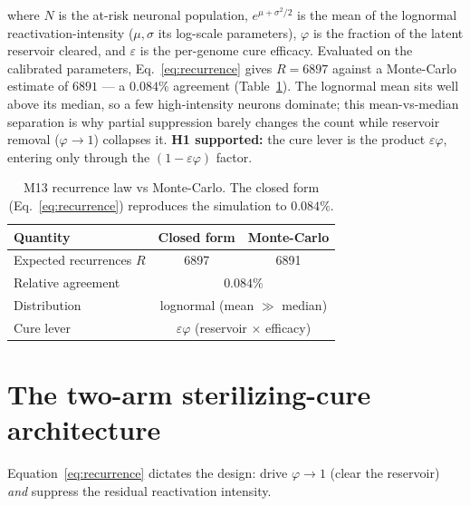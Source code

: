 \documentclass[11pt,a4paper]{article}
\begin{document}
where $N$ is the at-risk neuronal population, $e^{\mu+\sigma^2/2}$ is the mean of
the lognormal reactivation-intensity ($\mu,\sigma$ its log-scale parameters),
$\varphi$ is the fraction of the latent reservoir cleared, and $\varepsilon$ is
the per-genome cure efficacy. Evaluated on the calibrated parameters,
Eq.~\eqref{eq:recurrence} gives $R = 6897$ against a Monte-Carlo estimate of
$6891$ --- a $0.084\%$ agreement (Table~\ref{tab:m13}). The lognormal mean
sits well above its median, so a few high-intensity neurons dominate; this
mean-vs-median separation is why partial suppression barely changes the count
while reservoir removal ($\varphi\to 1$) collapses it. \textbf{H1 supported:}
the cure lever is the product $\varepsilon\varphi$, entering only through the
$(1-\varepsilon\varphi)$ factor.

\begin{table}[t]
\centering
\caption{M13 recurrence law vs Monte-Carlo. The closed form
(Eq.~\ref{eq:recurrence}) reproduces the simulation to $0.084\%$.}
\label{tab:m13}
\small
\begin{tabular}{@{}lcc@{}}
\toprule
Quantity & Closed form & Monte-Carlo \\
\midrule
Expected recurrences $R$ & 6897 & 6891 \\
Relative agreement & \multicolumn{2}{c}{$0.084\%$} \\
Distribution & \multicolumn{2}{c}{lognormal (mean $\gg$ median)} \\
Cure lever & \multicolumn{2}{c}{$\varepsilon\varphi$ (reservoir $\times$ efficacy)} \\
\bottomrule
\end{tabular}
\end{table}

\section{The two-arm sterilizing-cure architecture}
\label{sec:arch}
Equation~\eqref{eq:recurrence} dictates the design: drive $\varphi\to 1$
(clear the reservoir) \emph{and} suppress the residual reactivation intensity.
\end{document}

